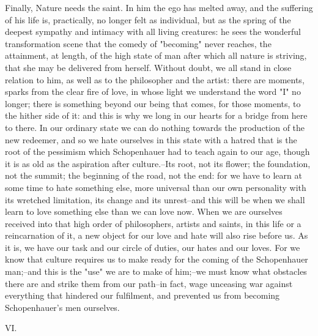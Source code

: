 Finally, Nature needs the saint. In him the ego has melted away, and
the suffering of his life is, practically, no longer felt as
individual, but as the spring of the deepest sympathy and intimacy
with all living creatures: he sees the wonderful transformation scene
that the comedy of "becoming" never reaches, the attainment, at
length, of the high state of man after which all nature is striving,
that she may be delivered from herself. Without doubt, we all stand
in close relation to him, as well as to the philosopher and the
artist: there are moments, sparks from the clear fire of love, in
whose light we understand the word "I" no longer; there is something
beyond our being that comes, for those moments, to the hither side of
it: and this is why we long in our hearts for a bridge from here to
there. In our ordinary state we can do nothing towards the production
of the new redeemer, and so we hate ourselves in this state with a
hatred that is the root of the pessimism which Schopenhauer had to
teach again to our age, though it is as old as the aspiration after
culture.--Its root, not its flower; the foundation, not the summit;
the beginning of the road, not the end: for we have to learn at some
time to hate something else, more universal than our own personality
with its wretched limitation, its change and its unrest--and this
will be when we shall learn to love something else than we can love
now. When we are ourselves received into that high order of
philosophers, artists and saints, in this life or a reincarnation of
it, a new object for our love and hate will also rise before us. As
it is, we have our task and our circle of duties, our hates and our
loves. For we know that culture requires us to make ready for the
coming of the Schopenhauer man;--and this is the "use" we are to make
of him;--we must know what obstacles there are and strike them from
our path--in fact, wage unceasing war against everything that
hindered our fulfilment, and prevented us from becoming
Schopenhauer's men ourselves.


VI.

